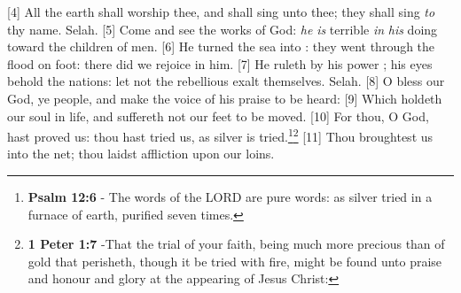 [4] \textcolor[cmyk]{0.99998,1,0,0}{All the earth shall worship thee, and shall sing unto thee; they shall sing \emph{to} thy name. Selah.}
[5] \textcolor[cmyk]{0.99998,1,0,0}{Come and see the works of God: \emph{he} \emph{is} terrible \emph{in} \emph{his} doing toward the children of men.} %
[6] \textcolor[cmyk]{0.99998,1,0,0}{He turned the sea into : they went through the flood on foot: there did we rejoice in him.} %
[7] \textcolor[cmyk]{0.99998,1,0,0}{He ruleth by his power ; his eyes behold the nations: let not the rebellious exalt themselves. Selah.}
[8] \textcolor[cmyk]{0.99998,1,0,0}{O bless our God, ye people, and make the voice of his praise to be heard:}
[9] \textcolor[cmyk]{0.99998,1,0,0}{Which holdeth our soul in life, and suffereth not our feet to be moved.}
[10] \textcolor[cmyk]{0.99998,1,0,0}{For thou, O God, hast proved us: thou hast tried us, as silver is tried.}\footnote{\textbf{Psalm 12:6} - The words of the LORD are pure words: as silver tried in a furnace of earth, purified seven times.}\footnote{\textbf{1 Peter 1:7} -That the trial of your faith, being much more precious than of gold that perisheth, though it be tried with fire, might be found unto praise and honour and glory at the appearing of Jesus Christ:}
[11] \textcolor[cmyk]{0.99998,1,0,0}{Thou broughtest us into the net; thou laidst affliction upon our loins.}
